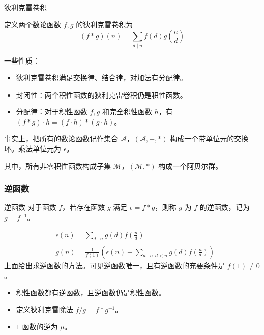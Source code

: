 \documentclass[../main.tex]{subfiles}
\begin{document}
\begin{frame}{狄利克雷卷积}
\begin{defi}
定义两个数论函数 $f,g$ 的狄利克雷卷积为
$$
(f*g)(n)=\sum_{d\mid n}f(d)g(\frac{n}{d})
$$
\end{defi}\pause

一些性质：
\begin{itemize}
\item 狄利克雷卷积满足交换律、结合律，对加法有分配律。\pause
\item 封闭性：两个积性函数的狄利克雷卷积仍是积性函数。\pause
\item 分配律：对于积性函数 $f,g$ 和完全积性函数 $h$，有 $(f*g)\cdot h=(f\cdot h)*(g\cdot h)$。
\end{itemize}
\end{frame}

\begin{frame}
事实上，把所有的数论函数记作集合 $\mathcal{A}$，$(\mathcal{A},+,*)$ 构成一个带单位元的交换环。乘法单位元为 $\epsilon$。\pause

其中，所有非零积性函数构成子集 $\mathcal{M}$，$(\mathcal{M},*)$ 构成一个阿贝尔群。
\end{frame}

\subsubsection{逆函数}

\begin{frame}{逆函数}
对于函数 $f$，若存在函数 $g$ 满足 $\epsilon=f*g$，则称 $g$ 为 $f$ 的逆函数，记为 $g=f^{-1}$。\pause

$$
\begin{aligned}
&\epsilon(n)=\sum_{d\mid n}g(d)f(\frac{n}{d})\\
&g(n)=\frac{1}{f(1)}(\epsilon(n)-\sum_{d\mid n,d<n}g(d)f(\frac{n}{d}))
\end{aligned}
$$
上面给出求逆函数的方法。可见逆函数唯一，且有逆函数的充要条件是 $f(1)\neq 0$。\pause

\begin{itemize}
\item 积性函数都有逆函数，且逆函数仍是积性函数。\pause

\item 定义狄利克雷除法 $f/g=f*g^{-1}$。\pause

\item $1$ 函数的逆为 $\mu$。
\end{itemize}
\end{frame}
\end{document}
